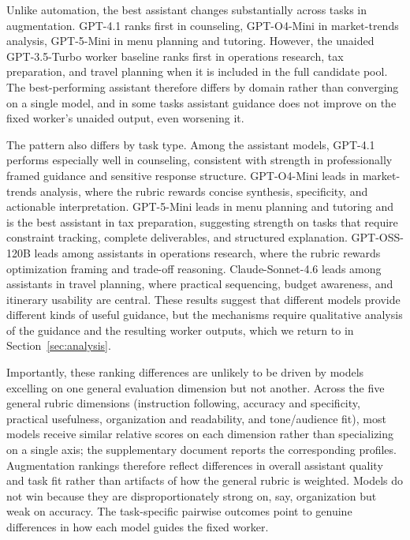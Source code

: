 Unlike automation, the best assistant changes substantially across tasks in augmentation. GPT-4.1 ranks first in counseling, GPT-O4-Mini in market-trends analysis, GPT-5-Mini in menu planning and tutoring. However, the unaided GPT-3.5-Turbo worker baseline ranks first in operations research, tax preparation, and travel planning when it is included in the full candidate pool. The best-performing assistant therefore differs by domain rather than converging on a single model, and in some tasks assistant guidance does not improve on the fixed worker's unaided output, even worsening it.

The pattern also differs by task type. Among the assistant models, GPT-4.1 performs especially well in counseling, consistent with strength in professionally framed guidance and sensitive response structure. GPT-O4-Mini leads in market-trends analysis, where the rubric rewards concise synthesis, specificity, and actionable interpretation. GPT-5-Mini leads in menu planning and tutoring and is the best assistant in tax preparation, suggesting strength on tasks that require constraint tracking, complete deliverables, and structured explanation. GPT-OSS-120B leads among assistants in operations research, where the rubric rewards optimization framing and trade-off reasoning. Claude-Sonnet-4.6 leads among assistants in travel planning, where practical sequencing, budget awareness, and itinerary usability are central. These results suggest that different models provide different kinds of useful guidance, but the mechanisms require qualitative analysis of the guidance and the resulting worker outputs, which we return to in Section~\ref{sec:analysis}.

Importantly, these ranking differences are unlikely to be driven by models excelling on one general evaluation dimension but not another. Across the five general rubric dimensions (instruction following, accuracy and specificity, practical usefulness, organization and readability, and tone/audience fit), most models receive similar relative scores on each dimension rather than specializing on a single axis; the supplementary document reports the corresponding profiles. Augmentation rankings therefore reflect differences in overall assistant quality and task fit rather than artifacts of how the general rubric is weighted. Models do not win because they are disproportionately strong on, say, organization but weak on accuracy. The task-specific pairwise outcomes point to genuine differences in how each model guides the fixed worker.

